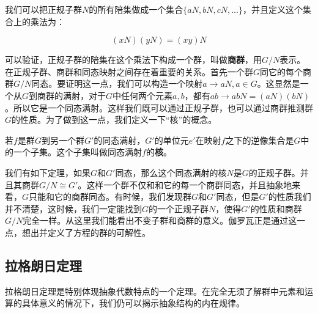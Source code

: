 \documentclass[b5paper]{ctexart}
\begin{document}
我们可以把正规子群$N$的所有陪集做成一个集合$\{aN, bN, cN, ...\}$，并且定义这个集合上的乘法为：

\[
(xN)(yN) = (xy)N
\]

可以验证，正规子群的陪集在这个乘法下构成一个群，叫做\textbf{商群}，用$G/N$表示。在正规子群、商群和同态映射之间存在着重要的关系。首先一个群$G$同它的每个商群$G/N$同态。要证明这一点，我们可以构造一个映射$a \to aN, a \in G$。这显然是一个从$G$到商群的满射，对于$G$中任何两个元素$a, b$，都有$ab \to abN = (aN)(bN)$。所以它是一个同态满射。这样我们既可以通过正规子群，也可以通过商群推测群$G$的性质。为了做到这一点，我们定义一下“核”的概念。

\begin{definition}
若$f$是群$G$到另一个群$G'$的同态满射，$G'$的单位元$e'$在映射$f$之下的逆像集合是$G$中的一个子集。这个子集叫做同态满射$f$的\textbf{核}。
\end{definition}

我们有如下定理，如果$G$和$G'$同态，那么这个同态满射的核$N$是$G$的正规子群。并且其商群$G/N \cong G'$。这样一个群不仅和和它的每一个商群同态，并且抽象地来看，$G$只能和它的商群同态。有时候，我们发现群$G$和$G'$同态，但是$G'$的性质我们并不清楚，这时候，我们一定能找到$G$的一个正规子群$N$，使得$G'$的性质和商群$G/N$完全一样。从这里我们能看出不变子群和商群的意义。伽罗瓦正是通过这一点，想出并定义了方程的群的可解性。

\begin{Exercise}
\end{Exercise}

\subsection{拉格朗日定理}

拉格朗日定理是特别体现抽象代数特点的一个定理。在完全无须了解群中元素和运算的具体意义的情况下，我们仍可以揭示抽象结构的内在规律。
\end{document}
